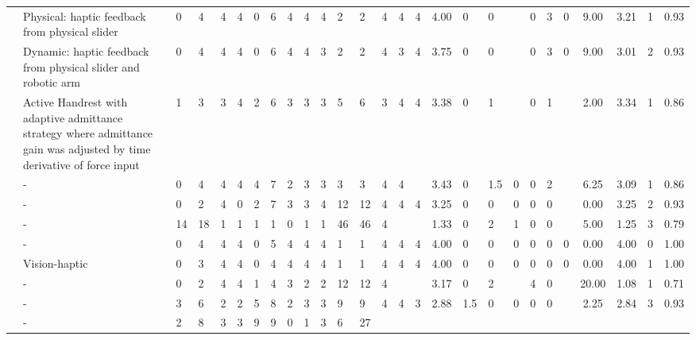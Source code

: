 \begin{table}[htbp]
\begin{tabular}{lp{4cm}lllllllllllllllllllllcccc}
\cite{Dai2023} &
  Physical: haptic feedback from physical slider &
  0 &
  4 &
  4 &
  4 &
  0 &
  6 &
  4 &
  4 &
  4 &
  2 &
  2 &
  4 &
  4 &
  4 &
  4.00 &
  0 &
  0 &
   &
  0 &
  3 &
  0 &
  9.00 &
  3.21 &
  1 &
  0.93 \\
\cite{Dai2023} &
  Dynamic: haptic feedback from physical slider and robotic arm &
  0 &
  4 &
  4 &
  4 &
  0 &
  6 &
  4 &
  4 &
  3 &
  2 &
  2 &
  4 &
  3 &
  4 &
  3.75 &
  0 &
  0 &
   &
  0 &
  3 &
  0 &
  9.00 &
  3.01 &
  2 &
  0.93 \\
\cite{Fehlberg2012} &
  Active Handrest with adaptive admittance strategy where   admittance gain was adjusted by time derivative of force input &
  1 &
  3 &
  3 &
  4 &
  2 &
  6 &
  3 &
  3 &
  3 &
  5 &
  6 &
  3 &
  4 &
  4 &
  3.38 &
  0 &
  1 &
   &
  0 &
  1 &
   &
  2.00 &
  3.34 &
  1 &
  0.86 \\
\cite{Grant2019} &
  - &
  0 &
  4 &
  4 &
  4 &
  4 &
  7 &
  2 &
  3 &
  3 &
  3 &
  3 &
  4 &
  4 &
   &
  3.43 &
  0 &
  1.5 &
  0 &
  0 &
  2 &
   &
  6.25 &
  3.09 &
  1 &
  0.86 \\
\cite{Gunter2022} &
  - &
  0 &
  2 &
  4 &
  0 &
  2 &
  7 &
  3 &
  3 &
  4 &
  12 &
  12 &
  4 &
  4 &
  4 &
  3.25 &
  0 &
  0 &
  0 &
  0 &
  0 &
   &
  0.00 &
  3.25 &
  2 &
  0.93 \\
\cite{Hanashima2023} &
  - &
  14 &
  18 &
  1 &
  1 &
  1 &
  1 &
  0 &
  1 &
  1 &
  46 &
  46 &
  4 &
   &
   &
  1.33 &
  0 &
  2 &
  1 &
  0 &
  0 &
   &
  5.00 &
  1.25 &
  3 &
  0.79 \\
\cite{Huang2006} &
  - &
  0 &
  4 &
  4 &
  4 &
  0 &
  5 &
  4 &
  4 &
  4 &
  1 &
  1 &
  4 &
  4 &
  4 &
  4.00 &
  0 &
  0 &
  0 &
  0 &
  0 &
  0 &
  0.00 &
  4.00 &
  0 &
  1.00 \\
\cite{Huang2007} &
  Vision-haptic &
  0 &
  3 &
  4 &
  4 &
  0 &
  4 &
  4 &
  4 &
  4 &
  1 &
  1 &
  4 &
  4 &
  4 &
  4.00 &
  0 &
  0 &
  0 &
  0 &
  0 &
  0 &
  0.00 &
  4.00 &
  1 &
  1.00 \\
\cite{Lee2012} &
  - &
  0 &
  2 &
  4 &
  4 &
  1 &
  4 &
  3 &
  2 &
  2 &
  12 &
  12 &
  4 &
   &
   &
  3.17 &
  0 &
  2 &
   &
  4 &
  0 &
   &
  20.00 &
  1.08 &
  1 &
  0.71 \\
\cite{LeeY2019} &
  - &
  3 &
  6 &
  2 &
  2 &
  5 &
  8 &
  2 &
  3 &
  3 &
  9 &
  9 &
  4 &
  4 &
  3 &
  2.88 &
  1.5 &
  0 &
  0 &
  0 &
  0 &
   &
  2.25 &
  2.84 &
  3 &
  0.93 \\
\cite{LiuH2019} &
  - &
  2 &
  8 &
  3 &
  3 &
  9 &
  9 &
  0 &
  1 &
  3 &
  6 &
  27 &

\end{tabular}
\end{table}
